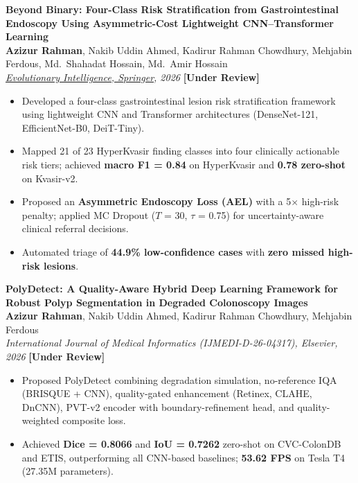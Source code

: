 \documentclass[10.5pt,letterpaper]{article}
\newcommand{\pubentry}[4]{%
  \noindent\textbf{#1}\\[1pt]
  \noindent #2\\[1pt]
  \noindent\textit{#3} \hfill \textbf{[#4]}\\[4pt]
}
\begin{document}
\vspace{6pt}

\pubentry
  {Beyond Binary: Four-Class Risk Stratification from Gastrointestinal Endoscopy Using Asymmetric-Cost Lightweight CNN--Transformer Learning}
  {\textbf{Azizur Rahman}, Nakib Uddin Ahmed, Kadirur Rahman Chowdhury, Mehjabin Ferdous, Md.\ Shahadat Hossain, Md.\ Amir Hossain}
  {\href{https://www.researchsquare.com/article/rs-10475241/v1}{Evolutionary Intelligence, Springer}, 2026}
  {Under Review}

\begin{itemize}
  \item Developed a four-class gastrointestinal lesion risk stratification framework using lightweight CNN and Transformer architectures (DenseNet-121, EfficientNet-B0, DeiT-Tiny).
  \item Mapped 21 of 23 HyperKvasir finding classes into four clinically actionable risk tiers; achieved \textbf{macro F1 = 0.84} on HyperKvasir and \textbf{0.78 zero-shot} on Kvasir-v2.
  \item Proposed an \textbf{Asymmetric Endoscopy Loss (AEL)} with a 5$\times$ high-risk penalty; applied MC Dropout ($T$ = 30, $\tau$ = 0.75) for uncertainty-aware clinical referral decisions.
  \item Automated triage of \textbf{44.9\% low-confidence cases} with \textbf{zero missed high-risk lesions}.
\end{itemize}

\vspace{6pt}

\pubentry
  {PolyDetect: A Quality-Aware Hybrid Deep Learning Framework for Robust Polyp Segmentation in Degraded Colonoscopy Images}
  {\textbf{Azizur Rahman}, Nakib Uddin Ahmed, Kadirur Rahman Chowdhury, Mehjabin Ferdous}
  {International Journal of Medical Informatics (IJMEDI-D-26-04317), Elsevier, 2026}
  {Under Review}

\begin{itemize}
  \item Proposed PolyDetect combining degradation simulation, no-reference IQA (BRISQUE + CNN), quality-gated enhancement (Retinex, CLAHE, DnCNN), PVT-v2 encoder with boundary-refinement head, and quality-weighted composite loss.
  \item Achieved \textbf{Dice = 0.8066} and \textbf{IoU = 0.7262} zero-shot on CVC-ColonDB and ETIS, outperforming all CNN-based baselines; \textbf{53.62 FPS} on Tesla T4 (27.35M parameters).
\end{itemize}
\end{document}
